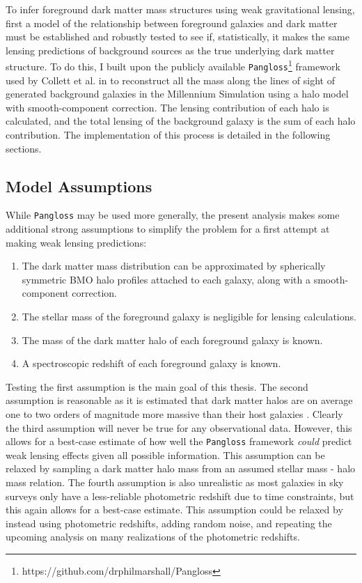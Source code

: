 \documentclass[%
 reprint,
 amsmath,amssymb,
 aps,nofootinbib
]{revtex4-1}
\begin{document}
To infer foreground dark matter mass structures using weak gravitational lensing, first a model of the relationship between foreground galaxies and dark matter must be established and robustly tested to see if, statistically, it makes the same lensing predictions of background sources as the true underlying dark matter structure. To do this, I built upon the publicly available \texttt{Pangloss}\footnote{\label{note1}https://github.com/drphilmarshall/Pangloss} framework used by Collett et al. in \cite{collett} to reconstruct all the
mass along the lines of sight of generated background galaxies in the Millennium Simulation using a halo model with smooth-component correction. The lensing contribution of each halo is calculated, and the total lensing of the background galaxy is the sum of each halo contribution. The implementation of this process is detailed in the following sections.


\subsection{Model Assumptions} \label{assumptions}
While \texttt{Pangloss} may be used more generally, the present analysis makes some additional strong assumptions to simplify the problem for a first attempt at making weak lensing predictions:

\begin{enumerate}
\item The dark matter mass distribution can be approximated by spherically symmetric BMO halo profiles attached to each galaxy, along with a smooth-component correction.
\item The stellar mass of the foreground galaxy is negligible for lensing calculations.
\item The mass of the dark matter halo of each foreground galaxy is known.
\item A spectroscopic redshift of each foreground galaxy is known.
\end{enumerate}

Testing the first assumption is the main goal of this thesis. The second assumption is reasonable as it is estimated that dark matter halos are on average one to two orders of magnitude more massive than their host galaxies \cite{smhr}. Clearly the third assumption will never be true for any observational data. However, this allows for a best-case estimate of how well the \texttt{Pangloss} framework \textit{could} predict weak lensing effects given all possible information. This assumption can be relaxed by sampling a dark matter halo mass from an assumed stellar mass - halo mass relation. The fourth assumption is also unrealistic as most galaxies in sky surveys only have a less-reliable photometric redshift due to time constraints, but this again allows for a best-case estimate. This assumption could be relaxed by instead using photometric redshifts, adding random noise, and repeating the upcoming analysis on many realizations of the photometric redshifts.
\end{document}
